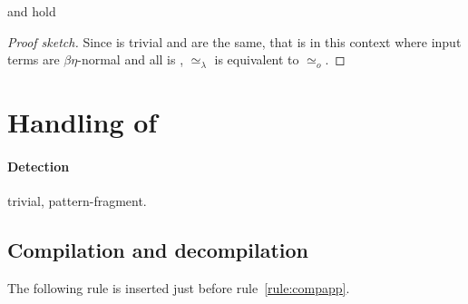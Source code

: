 \documentclass[sigconf,natbib=false,review]{acmart}
\newcommand{\appsep}{\ensuremath{\textcolor{lightgray}{\cdot}}}
\newcommand{\UnifRel}{\ensuremath{\simeq}}
\newcommand{\Uo}{\ensuremath{\UnifRel_o}\xspace}
\newcommand{\Ue}{\ensuremath{\UnifRel_\lambda}\xspace}
\begin{document}
\begin{theorem}  and
 hold
\end{theorem}
\begin{proof}[Proof sketch]
Since  is trivial \fstep and \hstep are the same, that is
in this
context where input terms are $\beta\eta$-normal and all is \wellb,
\Ue is equivalent to \Uo.
\end{proof}


  
\section{Handling of \maybebeta}\label{sec:llam}

\paragraph{Detection} trivial, pattern-fragment.
\subsection{Compilation and decompilation}

The following rule is inserted just before rule~\ref{rule:compapp}.
\end{document}
